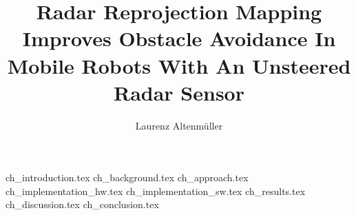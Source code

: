 \documentclass[%
    fontsize=12pt,
    headinclude,
    paper=a4,
    numbers=noenddot,
    listof=totoc,
    bibliography=totoc,
    index=totoc,
    twoside=false,
]{diplomarbeit}
\title{Radar Reprojection Mapping Improves Obstacle Avoidance In Mobile Robots With An Unsteered Radar Sensor}
\author{Laurenz Altenmüller}
\begin{document}
\maketitle

\renewcommand{\thepage}{}
\cleardoublepage



\pagestyle{empty}
\cleardoublepage
\setcounter{page}{3}	%
\renewcommand{\thepage}{\roman{page}}

\pagestyle{headings}
\tableofcontents





\newpage{\pagestyle{plain}\cleardoublepage}
\rmfamily
\renewcommand{\thepage}{\arabic{page}}
\setcounter{page}{1}

{ch_introduction.tex}
{ch_background.tex}
{ch_approach.tex}
{ch_implementation_hw.tex}
{ch_implementation_sw.tex}
{ch_results.tex}
{ch_discussion.tex}
{ch_conclusion.tex}


\cleardoublepage
\appendixpage
\begin{appendix}





\end{appendix}

\listoffigures
\listoftables

\clearpage
\printindex

\clearpage
\printbibliography
\end{document}
